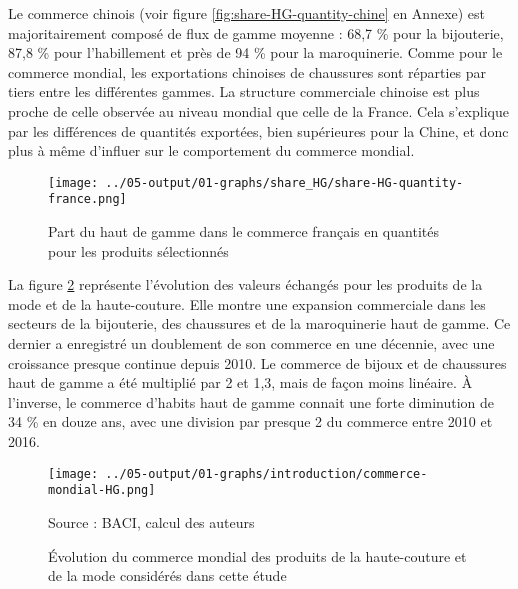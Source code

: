 \documentclass[french,10pt,a4paper]{article}
\begin{document}
Le commerce chinois (voir figure \ref{fig:share-HG-quantity-chine} en Annexe) est majoritairement composé de flux de gamme moyenne : 68,7 \% pour la bijouterie, 87,8 \% pour l'habillement et près de 94 \% pour la maroquinerie. Comme pour le commerce mondial, les exportations chinoises de chaussures sont réparties par tiers entre les différentes gammes. La structure commerciale chinoise est plus proche de celle observée au niveau mondial que celle de la France. Cela s'explique par les différences de quantités exportées, bien supérieures pour la Chine, et donc plus à même d'influer sur le comportement du commerce mondial. 

\begin{figure}[!h]
  \centering
  \texttt{[image: ../05-output/01-graphs/share\_HG/share-HG-quantity-france.png]}
  \caption{Part du haut de gamme dans le commerce français en quantités pour les produits sélectionnés}
  \label{fig:share-HG-quantity-france}
\end{figure}


\bigskip

La figure \ref{fig:commerce-mondial-HG} représente l'évolution des valeurs échangés pour les produits de la mode et de la haute-couture. Elle montre une expansion commerciale dans les secteurs de la bijouterie, des chaussures et de la maroquinerie haut de gamme. Ce dernier a enregistré un doublement de son commerce en une décennie, avec une croissance presque continue depuis 2010. Le commerce de bijoux et de chaussures haut de gamme a été multiplié par 2 et 1,3, mais de façon moins linéaire. À l'inverse, le commerce d'habits haut de gamme connait une forte diminution de 34 \% en douze ans, avec une division par presque 2 du commerce entre 2010 et 2016.

\begin{figure}[!h]
  \centering
  \texttt{[image: ../05-output/01-graphs/introduction/commerce-mondial-HG.png]}
  \captionsetup{justification=raggedright,singlelinecheck=false, font=small}
  \caption*{Source : BACI, calcul des auteurs}
  \captionsetup{justification=centering, singlelinecheck=true, font=normalsize}
  \caption{Évolution du commerce mondial des produits de la haute-couture et de la mode considérés dans cette étude}
  \label{fig:commerce-mondial-HG}
\end{figure}
\end{document}

